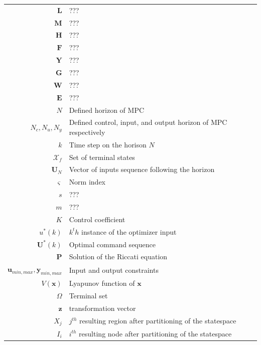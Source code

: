 \begin{scriptsize}
\begin{tabularx}{\textwidth}{r|X}
	$\textbf{L}$																&???\\
	$\textbf{M}$																&???\\
	$\textbf{H}$																&???\\
	$\textbf{F}$																&???\\
	$\textbf{Y}$																&???\\
	$\textbf{G}$																&???\\
	$\textbf{W}$																&???\\
	$\textbf{E}$																&???\\
	$N$											& Defined horizon of MPC\\
	$N_c,N_u,N_y$											& Defined control, input, and output horizon of MPC respectively\\
	$k$																& Time step on the horison $N$ \\
	$\mathcal{X}_f$															& Set of terminal states \\
	$\textbf{U}_N$										& Vector of inputs sequence following the horizon\\
	$\varsigma$											& Norm index\\
	$s$																& ???\\
	$m$																& ???\\
	$K$															& Control coefficient \\
	$u^*(k)$													& $k^th$ instance of the optimizer input\\
	$\textbf{U}^*(k)$									& Optimal command sequence\\
	$\textbf{P}$																& Solution of the Riccati equation\\
	$\textbf{u}_{min,max},\textbf{y}_{min,max}$					& Input and output constraints\\
	$V(\textbf{x})$														& Lyapunov function of $\textbf{x}$\\
	$\Omega$ 													& Terminal set\\
	$\textbf{z}$																& transformation vector\\
	$X_j$															& $j^{th}$ resulting region after partitioning of the statespace\\
	$I_i$															& $i^{th}$ resulting node after partitioning of the statespace\\
	
\end{tabularx}
\end{scriptsize}

%

